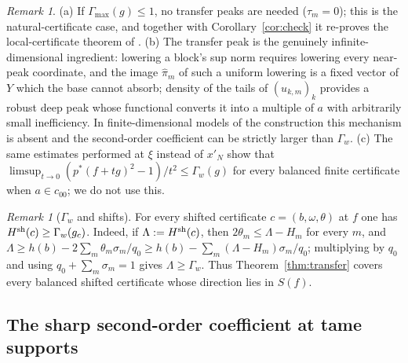 \documentclass[10pt]{amsart}
\theoremstyle{definition}
\theoremstyle{remark}
\newtheorem{remark}[theorem]{Remark}
\begin{document}
\begin{remark}\label{rem:transfer}
(a) If $\Gamma_{\max}(g)\le1$, no transfer peaks are needed ($\tau_m=0$);
this is the natural-certificate case, and together with
Corollary~\ref{cor:check} it re-proves the local-certificate theorem of
\cite{Check}.  (b) The transfer peak is the genuinely infinite-dimensional
ingredient: lowering a block's sup norm requires lowering every near-peak
coordinate, and the image $\hat\pi_m$ of such a uniform lowering is a fixed
vector of $Y$ which the base cannot absorb; density of the tails of
$(u_{k,m})_k$ provides a robust deep peak whose functional converts it into
a multiple of $a$ with arbitrarily small inefficiency.  In finite-dimensional
models of the construction this mechanism is absent and the second-order
coefficient can be strictly larger than $\Gamma_w$.  (c) The same estimates
performed at $\xi$ instead of $x'_N$ show that
$\limsup_{t\to0}(p^*(f+tg)^2-1)/t^2\le\Gamma_w(g)$ for every balanced finite
certificate when $a\in c_{00}$; we do not use this.
\end{remark}

\begin{remark}[$\Gamma_w$ and shifts]\label{rem:gammaw}
For every shifted certificate $c=(b,\omega,\theta)$ at $f$ one has
$H^{\rm sh}(c)\ge\Gamma_w(g_c)$.  Indeed, if $\Lambda:=H^{\rm sh}(c)$, then
$2\theta_m\le\Lambda-H_m$ for every $m$, and
$\Lambda\ge h(b)-2\sum_m\theta_m\sigma_m/q_0\ge h(b)-\sum_m(\Lambda-H_m)
\sigma_m/q_0$; multiplying by $q_0$ and using $q_0+\sum_m\sigma_m=1$ gives
$\Lambda\ge\Gamma_w$.  Thus Theorem~\ref{thm:transfer} covers every
balanced shifted certificate whose direction lies in $S(f)$.
\end{remark}

\subsection{The sharp second-order coefficient at tame supports}
\end{document}
